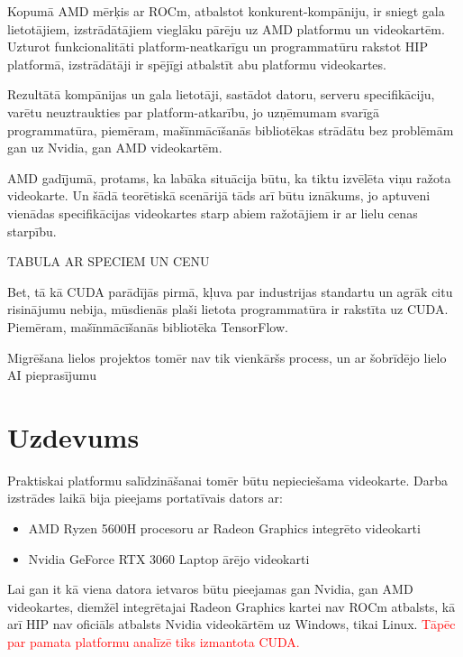 \documentclass[12pt]{report}%
\theoremstyle{definition}
\begin{document}




Kopumā AMD mērķis ar ROCm, atbalstot konkurent-kompāniju, ir sniegt gala lietotājiem, izstrādātājiem
vieglāku pārēju uz AMD platformu un videokartēm. Uzturot funkcionalitāti platform-neatkarīgu un
programmatūru rakstot HIP platformā, izstrādātāji ir spējīgi atbalstīt abu platformu videokartes.

Rezultātā kompānijas un gala lietotāji, sastādot datoru, serveru specifikāciju, varētu neuztraukties
par platform-atkarību, jo uzņēmumam svarīgā programmatūra, piemēram, mašīnmācīšanās bibliotēkas
strādātu bez problēmām gan uz Nvidia, gan AMD videokartēm.

AMD gadījumā, protams, ka labāka situācija būtu, ka tiktu izvēlēta viņu ražota videokarte. Un šādā teorētiskā
scenārijā tāds arī būtu iznākums, jo aptuveni vienādas specifikācijas videokartes starp abiem ražotājiem
ir ar lielu cenas starpību.

TABULA AR SPECIEM UN CENU


Bet, tā kā CUDA parādījās pirmā, kļuva par industrijas standartu un agrāk citu risinājumu nebija, 
mūsdienās plaši lietota programmatūra ir rakstīta uz CUDA. Piemēram, mašīnmācīšanās bibliotēka TensorFlow. \cite{tensorflow_github}

Migrēšana lielos projektos tomēr nav tik vienkāršs process, un ar šobrīdējo lielo AI pieprasījumu 


\chapter{Uzdevums}

Praktiskai platformu salīdzināšanai tomēr būtu nepieciešama videokarte.
Darba izstrādes laikā bija pieejams portatīvais dators ar:
\begin{itemize}
  \item AMD Ryzen 5600H procesoru ar Radeon Graphics integrēto videokarti
  \item Nvidia GeForce RTX 3060 Laptop ārējo videokarti
\end{itemize}

Lai gan it kā viena datora ietvaros būtu pieejamas gan Nvidia, gan AMD videokartes, diemžēl
integrētajai Radeon Graphics kartei nav ROCm atbalsts, kā arī HIP nav oficiāls atbalsts 
Nvidia videokārtēm uz Windows, tikai Linux. \textcolor{red}{Tāpēc par pamata platformu analīzē tiks izmantota CUDA.}
\end{document}
